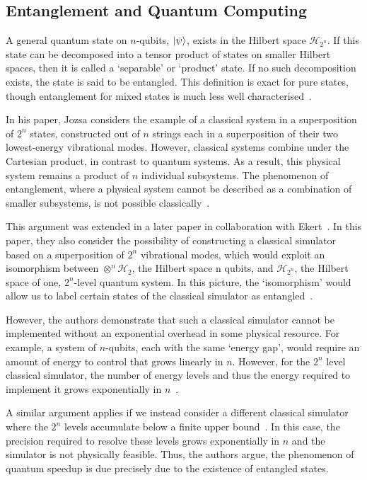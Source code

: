 \documentclass{standalone}
\begin{document}
\subsection{Entanglement and Quantum Computing}\label{sec:entanglement}
A general quantum state on $n$-qubits, $\ket{\psi}$, exists in the Hilbert space $\mathcal{H}_{2^{n}}$. If this state can be decomposed into a tensor product of states on smaller Hilbert spaces, then it is called a `separable' or `product' state. If no such decomposition exists, the state is said to be entangled. This definition is exact for pure states, though entanglement for mixed states is much less well characterised~\cite{Laflamme2001}. 
\par
In his paper, Jozsa considers the example of a classical system in a superposition of $2^{n}$ states, constructed out of $n$ strings each in a superposition of their two lowest-energy vibrational modes. However, classical systems combine under the Cartesian product, in contrast to quantum systems. As a result, this physical system remains a product of $n$ individual subsystems. The phenomenon of entanglement, where a physical system cannot be described as a combination of smaller subsystems, is not possible classically~\cite{Jozsa1997}. 
\par
This argument was extended in a later paper in collaboration with Ekert~\cite{Ekert1998}. In this paper, they also consider the possibility of constructing a classical simulator based on a superposition of $2^{n}$ vibrational modes, which would exploit an isomorphism between $\otimes^{n}\mathcal{H}_{2}$, the Hilbert space n qubits, and $\mathcal{H}_{2^{n}}$, the Hilbert space of one, $2^{n}$-level quantum system. In this picture, the `isomorphism' would allow us to label certain states of the classical simulator as entangled~\cite{Ekert1998}. 
\par
However, the authors demonstrate that such a classical simulator cannot be implemented without an exponential overhead in some physical resource. For example, a system of $n$-qubits, each with the same `energy gap', would require an amount of energy to control that grows linearly in $n$. However, for the $2^{n}$ level classical simulator, the number of energy levels and thus the energy required to implement it grows exponentially in $n$~\cite{Ekert1998}.
\par
A similar argument applies if we instead consider a different classical simulator where the $2^{n}$ levels accumulate below a finite upper bound~\cite{Jozsa2003}. In this case, the precision required to resolve these levels grows exponentially in $n$ and the simulator is not physically feasible. Thus, the authors argue, the phenomenon of quantum speedup is due precisely due to the existence of entangled states.  
\end{document}
